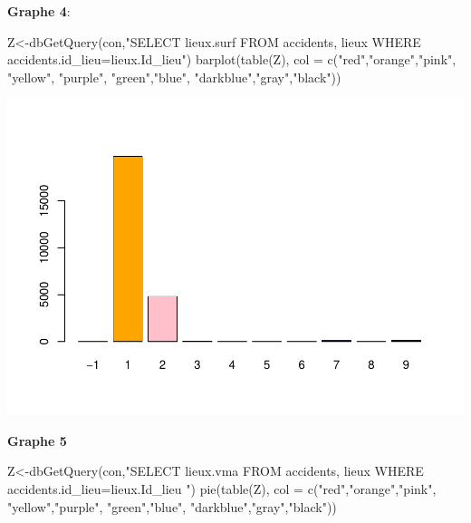 \documentclass[mstat,12pt]{unswthesis}
\newenvironment{Shaded}{\begin{snugshade}}{\end{snugshade}}
\newcommand{\AttributeTok}[1]{\textcolor[rgb]{0.77,0.63,0.00}{#1}}
\newcommand{\FunctionTok}[1]{\textcolor[rgb]{0.00,0.00,0.00}{#1}}
\newcommand{\NormalTok}[1]{#1}
\newcommand{\OtherTok}[1]{\textcolor[rgb]{0.56,0.35,0.01}{#1}}
\newcommand{\StringTok}[1]{\textcolor[rgb]{0.31,0.60,0.02}{#1}}
\begin{document}
\medskip

\textbf{Graphe 4}:

\begin{Shaded}
\begin{Highlighting}[]
\NormalTok{Z}\OtherTok{\textless{}{-}}\FunctionTok{dbGetQuery}\NormalTok{(con,}\StringTok{"SELECT lieux.surf FROM accidents,}
\StringTok{              lieux WHERE accidents.id\_lieu=lieux.Id\_lieu"}\NormalTok{)}
\FunctionTok{barplot}\NormalTok{(}\FunctionTok{table}\NormalTok{(Z), }\AttributeTok{col =} \FunctionTok{c}\NormalTok{(}\StringTok{"red"}\NormalTok{,}\StringTok{"orange"}\NormalTok{,}\StringTok{"pink"}\NormalTok{, }\StringTok{"yellow"}\NormalTok{,}
                          \StringTok{"purple"}\NormalTok{, }\StringTok{"green"}\NormalTok{,}\StringTok{"blue"}\NormalTok{, }\StringTok{"darkblue"}\NormalTok{,}\StringTok{"gray"}\NormalTok{,}\StringTok{"black"}\NormalTok{))}
\end{Highlighting}
\end{Shaded}

\includegraphics{rapport-G04_files/figure-latex/unnamed-chunk-15-1.pdf}

\medskip

\textbf{Graphe 5 }

\begin{Shaded}
\begin{Highlighting}[]
\NormalTok{Z}\OtherTok{\textless{}{-}}\FunctionTok{dbGetQuery}\NormalTok{(con,}\StringTok{"SELECT lieux.vma FROM accidents,}
\StringTok{lieux WHERE accidents.id\_lieu=lieux.Id\_lieu }
\StringTok{"}\NormalTok{)}
\FunctionTok{pie}\NormalTok{(}\FunctionTok{table}\NormalTok{(Z), }\AttributeTok{col =} \FunctionTok{c}\NormalTok{(}\StringTok{"red"}\NormalTok{,}\StringTok{"orange"}\NormalTok{,}\StringTok{"pink"}\NormalTok{, }\StringTok{"yellow"}\NormalTok{,}\StringTok{"purple"}\NormalTok{,}
                      \StringTok{"green"}\NormalTok{,}\StringTok{"blue"}\NormalTok{, }\StringTok{"darkblue"}\NormalTok{,}\StringTok{"gray"}\NormalTok{,}\StringTok{"black"}\NormalTok{))}
\end{Highlighting}
\end{Shaded}
\end{document}
